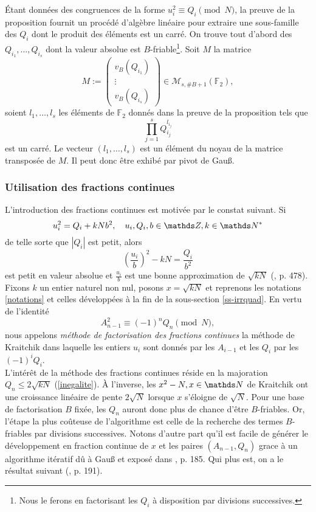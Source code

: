 \label{matrice-gauss}
Étant données des congruences de la forme $u_i^2 \equiv Q_i \pmod{N}$, la
preuve de la proposition fournit un procédé d'algèbre linéaire pour extraire
une sous-famille des $Q_i$ dont le produit des éléments est un carré. On trouve
tout d'abord des $Q_{i_1}, \dots, Q_{i_s}$ dont la valeur absolue est
$B$-friable\footnote{Nous le ferons en factorisant les $Q_i$ à disposition par
divisions successives.}. Soit $M$ la matrice \[M := \begin{pmatrix}
v_B(Q_{i_1}) \\ \vdots \\ v_B(Q_{i_s})\end{pmatrix}\in \mathcal{M}_{s,
\#B+1}(\mathbb{F}_2),\] soient $l_{1}, \dots, l_{s}$ les éléments de
$\mathbb{F}_2$ donnés dans la preuve de la proposition tels que \[\prod_{j=1}^s
Q_{i_j}^{l_{i_j}}\] est un carré. Le vecteur $(l_1, \dots, l_{s})$ est un
élément du noyau de la matrice transposée de $M$. Il peut donc être exhibé 
par pivot de Gau\ss{}.

\subsubsection{Utilisation des fractions continues}

L'introduction des fractions continues est motivée par le constat suivant. Si
\[u_i^2 = Q_i + kNb^2, \quad u_i, Q_i, b\in \Z, k\in \N^*\] de telle sorte que
$| Q_i |$ est petit, alors \[\left(\frac{u_i}{b}\right)^2 - kN =
\frac{Q_i}{b^2}\] est petit en valeur absolue et $\frac{u_i}{b}$ est une bonne
approximation de $\sqrt{kN}$ (\cite{Cohen}, p. 478). Fixons $k$ un entier
naturel non nul, posons $x = \sqrt{kN}$ et reprenons les notations
\ref{notations} et celles développées à la fin de la sous-section
\ref{ss-irrquad}. En vertu de l'identité \[A_{n-1}^2 \equiv (-1)^n Q_n
\pmod{N},\] nous appelons \emph{méthode de factorisation des fractions
continues} la méthode de Kraitchik dans laquelle les entiers $u_i$ sont donnés
par les $A_{i-1}$ et les $Q_i$ par les $(-1)^i Q_i$. \\

L'intérêt de la méthode des fractions continues réside en la majoration $Q_n
\leq 2\sqrt{kN}$ (\ref{inegalite}). À l'inverse, les $x^2 - N, x\in \N$ de
Kraitchik ont une croissance linéaire de pente $2\sqrt{N}$ lorsque $x$
s'éloigne de $\sqrt{N}$. Pour une base de factorisation $B$ fixée, les $Q_n$
auront donc plus de chance d'être $B$-friables. Or, l'étape la plus coûteuse de
l'algorithme est celle de la recherche des termes $B$-friables par divisions
successives. Notons d'autre part qu'il est facile de générer le développement
en fraction continue de $x$ et les paires $(A_{n-1}, Q_n)$ grace à un
algorithme itératif dû à Gau\ss{} et exposé dans \cite{MB}, p. 185. Qui plus
est, on a le résultat suivant (\cite{MB}, p. 191).

